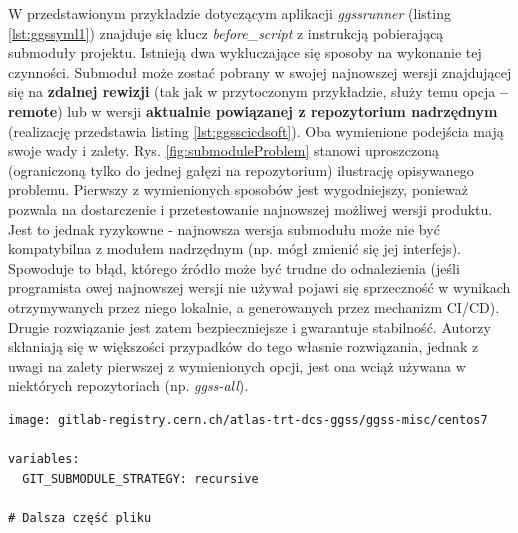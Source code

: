 W przedstawionym przykładzie dotyczącym aplikacji \textit{ggssrunner} (listing \ref{lst:ggssyml1}) znajduje się klucz \textit{before\_script} z instrukcją pobierającą submoduły projektu. Istnieją dwa wykluczające się sposoby na wykonanie tej czynności. Submoduł może zostać pobrany w swojej najnowszej wersji znajdującej się na \textbf{zdalnej rewizji} (tak jak w przytoczonym przykładzie, służy temu opcja \textbf{--remote}) lub w wersji \textbf{aktualnie powiązanej z repozytorium nadrzędnym} (realizację przedstawia listing \ref{lst:ggsscicdsoft}). Oba wymienione podejścia mają swoje wady i zalety. Rys. \ref{fig:submoduleProblem} stanowi uproszczoną (ograniczoną tylko do jednej gałęzi na repozytorium) ilustrację opisywanego problemu. Pierwszy z wymienionych sposobów jest wygodniejszy, ponieważ pozwala na dostarczenie i przetestowanie najnowszej możliwej wersji produktu. Jest to jednak ryzykowne - najnowsza wersja submodułu może nie być kompatybilna z modułem nadrzędnym (np. mógł zmienić się jej interfejs). Spowoduje to błąd, którego źródło może być trudne do odnalezienia (jeśli programista owej najnowszej wersji nie używał pojawi się sprzeczność w wynikach otrzymywanych przez niego lokalnie, a generowanych przez mechanizm CI/CD). Drugie rozwiązanie jest zatem bezpieczniejsze i gwarantuje stabilność. Autorzy skłaniają się w większości przypadków do tego własnie rozwiązania, jednak z uwagi na zalety pierwszej z wymienionych opcji, jest ona wciąż używana w niektórych repozytoriach (np. \textit{ggss-all}). 

\begin{lstlisting}[caption={Fragment pliku \textit{.gitlab-ci.yml} znajdującego się w repozytorium \textit{ggss-software-libs} pobierający submoduły projektu w wersji aktualnie powiązanej z repozytorium narzędnym}, label={lst:ggsscicdsoft}]
image: gitlab-registry.cern.ch/atlas-trt-dcs-ggss/ggss-misc/centos7

variables:
  GIT_SUBMODULE_STRATEGY: recursive

# Dalsza część pliku

\end{lstlisting}

